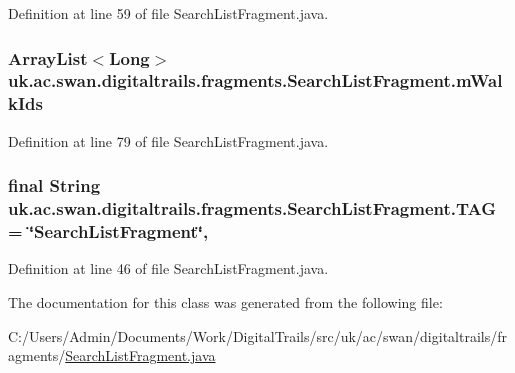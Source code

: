 Definition at line 59 of file Search\+List\+Fragment.\+java.

\hypertarget{classuk_1_1ac_1_1swan_1_1digitaltrails_1_1fragments_1_1_search_list_fragment_aae987d2b5032758e78eeee5b5205f20a}{
\subsubsection[{m\+Walk\+Ids}]{\setlength{\rightskip}{0pt plus 5cm}Array\+List$<$Long$>$ uk.\+ac.\+swan.\+digitaltrails.\+fragments.\+Search\+List\+Fragment.\+m\+Walk\+Ids\hspace{0.3cm}{\ttfamily [private]}}}\label{classuk_1_1ac_1_1swan_1_1digitaltrails_1_1fragments_1_1_search_list_fragment_aae987d2b5032758e78eeee5b5205f20a}


Definition at line 79 of file Search\+List\+Fragment.\+java.

\hypertarget{classuk_1_1ac_1_1swan_1_1digitaltrails_1_1fragments_1_1_search_list_fragment_af51d70026ab750fd479cf77abfa91910}{
\subsubsection[{T\+A\+G}]{\setlength{\rightskip}{0pt plus 5cm}final String uk.\+ac.\+swan.\+digitaltrails.\+fragments.\+Search\+List\+Fragment.\+T\+A\+G = \char`\"{}Search\+List\+Fragment\char`\"{}\hspace{0.3cm}{\ttfamily [static]}, {\ttfamily [private]}}}\label{classuk_1_1ac_1_1swan_1_1digitaltrails_1_1fragments_1_1_search_list_fragment_af51d70026ab750fd479cf77abfa91910}


Definition at line 46 of file Search\+List\+Fragment.\+java.



The documentation for this class was generated from the following file\+:\begin{DoxyCompactItemize}
\item 
C\+:/\+Users/\+Admin/\+Documents/\+Work/\+Digital\+Trails/src/uk/ac/swan/digitaltrails/fragments/\hyperlink{_search_list_fragment_8java}{Search\+List\+Fragment.\+java}\end{DoxyCompactItemize}
